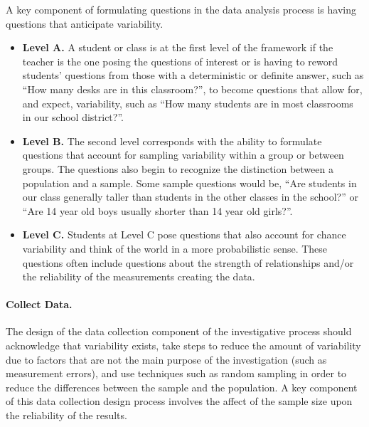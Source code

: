 \documentclass[
]{book}
\providecommand{\tightlist}{%
  \setlength{\itemsep}{0pt}\setlength{\parskip}{0pt}}
\theoremstyle{definition}
\theoremstyle{definition}
\theoremstyle{definition}
\theoremstyle{definition}
\theoremstyle{remark}
\begin{document}
A key component of formulating questions in the data analysis process is having questions that anticipate variability.

\begin{itemize}
\tightlist
\item
  \textbf{Level A.} A student or class is at the first level of the framework if the teacher is the one posing the questions of interest or is having to reword students' questions from those with a deterministic or definite answer, such as ``How many desks are in this classroom?'', to become questions that allow for, and expect, variability, such as ``How many students are in most classrooms in our school district?''.
\item
  \textbf{Level B.} The second level corresponds with the ability to formulate questions that account for sampling variability within a group or between groups. The questions also begin to recognize the distinction between a population and a sample. Some sample questions would be, ``Are students in our class generally taller than students in the other classes in the school?'' or ``Are 14 year old boys usually shorter than 14 year old girls?''.
\item
  \textbf{Level C.} Students at Level C pose questions that also account for chance variability and think of the world in a more probabilistic sense. These questions often include questions about the strength of relationships and/or the reliability of the measurements creating the data.
\end{itemize}

\hypertarget{collect-data.}{%
\paragraph*{Collect Data.}\label{collect-data.}}

The design of the data collection component of the investigative process should acknowledge that variability exists, take steps to reduce the amount of variability due to factors that are not the main purpose of the investigation (such as measurement errors), and use techniques such as random sampling in order to reduce the differences between the sample and the population. A key component of this data collection design process involves the affect of the sample size upon the reliability of the results.
\end{document}
